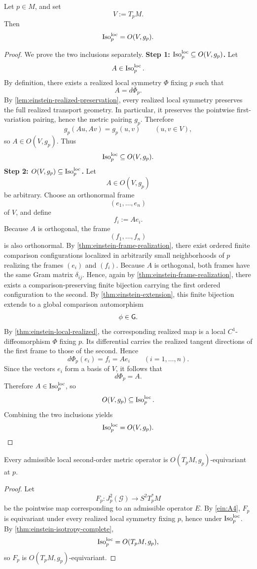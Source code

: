\begin{theorem}
	\label{thm:einstein-isotropy-complete}
	Let \(p\in M\), and set
	\[
		V:=T_pM.
	\]
	Then
	\[
		\operatorname{Iso}^{\mathrm{loc}}_p = O(V,g_p).
	\]
\end{theorem}
\begin{proof}
	We prove the two inclusions separately.
	\medskip
	\noindent
	\textbf{Step 1: \(\operatorname{Iso}^{\mathrm{loc}}_p\subseteq O(V,g_p)\).}
	Let
	\[
		A\in \operatorname{Iso}^{\mathrm{loc}}_p.
	\]
	By definition, there exists a realized local symmetry \(\Phi\) fixing
	\(p\) such that
	\[
		A=d\Phi_p.
	\]
	By \cref{lem:einstein-realized-preservation}, every realized local
	symmetry preserves the full realized transport geometry.
	In particular, it preserves the pointwise first-variation pairing, hence
	the metric pairing \(g_p\).
	Therefore
	\[
		g_p(Au,Av)=g_p(u,v)
		\qquad
		(u,v\in V),
	\]
	so \(A\in O(V,g_p)\).
	Thus
	\[
		\operatorname{Iso}^{\mathrm{loc}}_p\subseteq O(V,g_p).
	\]
	\medskip
	\noindent
	\textbf{Step 2: \(O(V,g_p)\subseteq \operatorname{Iso}^{\mathrm{loc}}_p\).}
	Let
	\[
		A\in O(V,g_p)
	\]
	be arbitrary.
	Choose an orthonormal frame
	\[
		(e_1,\dots,e_n)
	\]
	of \(V\), and define
	\[
		f_i:=Ae_i.
	\]
	Because \(A\) is orthogonal, the frame
	\[
		(f_1,\dots,f_n)
	\]
	is also orthonormal.
	By \cref{thm:einstein-frame-realization}, there exist ordered finite
	comparison configurations localized in arbitrarily small neighborhoods
	of \(p\) realizing the frames \((e_i)\) and \((f_i)\).
	Because \(A\) is orthogonal, both frames have the same Gram matrix
	\(\delta_{ij}\).
	Hence, again by \cref{thm:einstein-frame-realization}, there exists a
	comparison-preserving finite bijection carrying the first ordered
	configuration to the second.
	By \cref{thm:einstein-extension}, this finite bijection extends to a
	global comparison automorphism
	\[
		\phi\in\mathsf G.
	\]
	By \cref{thm:einstein-local-realized}, the corresponding realized map is
	a local \(C^1\)-diffeomorphism \(\Phi\) fixing \(p\).
	Its differential carries the realized tangent directions of the first
	frame to those of the second.
	Hence
	\[
		d\Phi_p(e_i)=f_i=Ae_i
		\qquad
		(i=1,\dots,n).
	\]
	Since the vectors \(e_i\) form a basis of \(V\), it follows that
	\[
		d\Phi_p=A.
	\]
	Therefore \(A\in\operatorname{Iso}^{\mathrm{loc}}_p\), so
	\[
		O(V,g_p)\subseteq \operatorname{Iso}^{\mathrm{loc}}_p.
	\]
	Combining the two inclusions yields
	\[
		\operatorname{Iso}^{\mathrm{loc}}_p = O(V,g_p).
	\]
\end{proof}
\begin{corollary}
	\label{cor:einstein-full-equivariance}
	Every admissible local second-order metric operator is
	\(O(T_pM,g_p)\)-equivariant at \(p\).
\end{corollary}
\begin{proof}
	Let
	\[
		F_p:J_p^2(\mathcal G)\to S^2T_p^*M
	\]
	be the pointwise map corresponding to an admissible operator \(E\).
	By \textup{\ref{ein:A4}}, \(F_p\) is equivariant under every realized
	local symmetry fixing \(p\), hence under \(\operatorname{Iso}^{\mathrm{loc}}_p\).
	By \cref{thm:einstein-isotropy-complete},
	\[
		\operatorname{Iso}^{\mathrm{loc}}_p = O(T_pM,g_p),
	\]
	so \(F_p\) is \(O(T_pM,g_p)\)-equivariant.
\end{proof}
